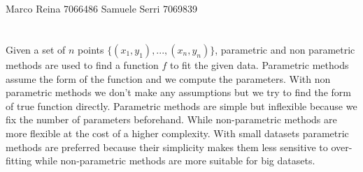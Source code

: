 \documentclass[12pt]{article}
\begin{document}
\section*{}
Marco Reina 7066486 \newline
Samuele Serri 7069839 \newline
\section*{}
Given a set of $n$ points $\{(x_1, y_1), ..., (x_n, y_n)\}$, parametric and non parametric methods are used to find a function $f$ to fit the given data. \newline
Parametric methods assume the form of the function and we compute the parameters. With non parametric methods we don't make any assumptions but we try to find the form of true function directly. \newline
Parametric methods are simple but inflexible because we fix the number of parameters beforehand. While non-parametric methods are more flexible at the cost of a higher complexity. \newline
With small datasets parametric methods are preferred because their simplicity makes them less sensitive to over-fitting while non-parametric methods are more suitable for big datasets.
\end{document}
